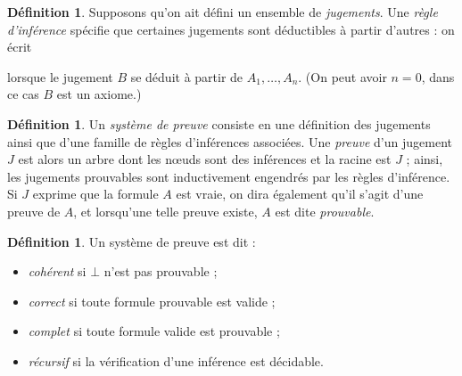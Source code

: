 \documentclass[a4paper, 11pt, twocolumn]{article}
\theoremstyle{definition}
\newtheorem{definition}[equation]{Définition}
\newcounter{n}
\def\L{{\cal{L}}}
\def\MM{\mathfrak{M}}
\begin{document}



\begin{definition}
  Supposons qu'on ait défini un ensemble de \emph{jugements}. Une \emph{règle
    d'inférence} spécifie que certaines jugements sont déductibles à partir
  d'autres : on écrit
  \begin{prooftree}
  \end{prooftree}
  lorsque le jugement $B$ se déduit à partir de $A_1, \ldots, A_n$. (On peut
  avoir $n = 0$, dans ce cas $B$ est un axiome.)
\end{definition}

\begin{definition}
  Un \emph{système de preuve} consiste en une définition des jugements ainsi que
  d'une famille de règles d'inférences associées. Une \emph{preuve} d'un
  jugement $J$ est alors un arbre dont les nœuds sont des inférences et la
  racine est $J$ ; ainsi, les jugements prouvables sont inductivement engendrés
  par les règles d'inférence. Si $J$ exprime que la formule $A$ est vraie, on
  dira également qu'il s'agit d'une preuve de $A$, et lorsqu'une telle preuve
  existe, $A$ est dite \emph{prouvable}.
\end{definition}

\begin{definition}
  Un système de preuve est dit :
  \begin{itemize}
  \item \emph{cohérent} si $\bot$ n'est pas prouvable ;
  \item \emph{correct} si toute formule prouvable est valide ;
  \item \emph{complet} si toute formule valide est prouvable ;
  \item \emph{récursif} si la vérification d'une inférence est décidable.
  \end{itemize}
\end{definition}
\end{document}
